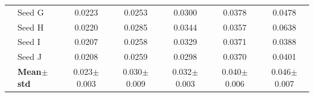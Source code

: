 \begin{table}[H]
{\begin{tabular}{@{}llccccc@{}}
  & Seed G & {\small 0.0223} & {\small 0.0253} & {\small 0.0300} & {\small 0.0378} & {\small 0.0478} \\
  & Seed H & {\small 0.0220} & {\small 0.0285} & {\small 0.0344} & {\small 0.0357} & {\small 0.0638} \\
  & Seed I & {\small 0.0207} & {\small 0.0258} & {\small 0.0329} & {\small 0.0371} & {\small 0.0388} \\
  & Seed J & {\small 0.0208} & {\small 0.0259} & {\small 0.0298} & {\small 0.0370} & {\small 0.0401} \\
 & \textbf{Mean$\pm$std} & \cellcolor{ForestGreen!25}0.023$\pm$0.003 & \cellcolor{ForestGreen!25}0.030$\pm$0.009 & \cellcolor{ForestGreen!25}0.032$\pm$0.003 & \cellcolor{ForestGreen!25}0.040$\pm$0.006 & \cellcolor{ForestGreen!25}0.046$\pm$0.007 \\
\bottomrule
\end{tabular}
}
\end{table}

